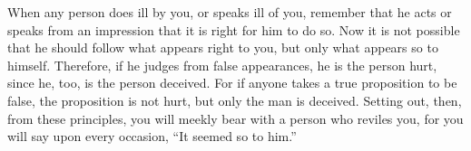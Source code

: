 When any person does ill by you, or speaks ill of you, remember that he
acts or speaks from an impression that it is right for him to do so. Now
it is not possible that he should follow what appears right to you, but
only what appears so to himself. Therefore, if he judges from false
appearances, he is the person hurt, since he, too, is the person
deceived. For if anyone takes a true proposition to be false, the
proposition is not hurt, but only the man is deceived. Setting out, then,
from these principles, you will meekly bear with a person who reviles
you, for you will say upon every occasion, ``It seemed so to him.''
